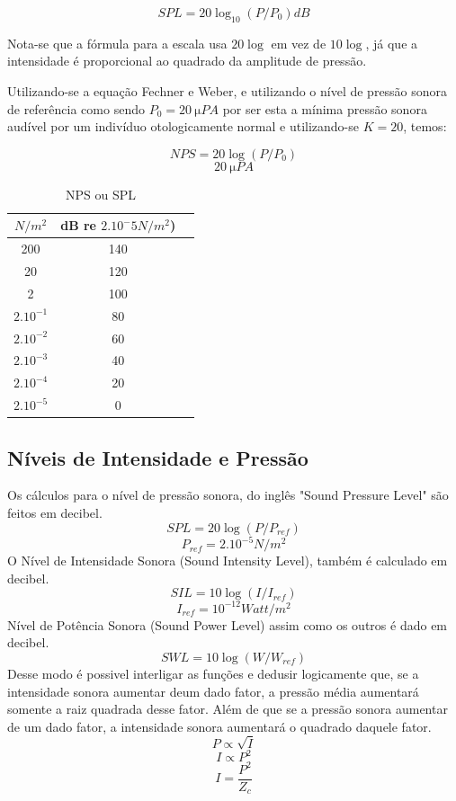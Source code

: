 \documentclass[
	article,			%
	11pt,				%
	oneside,			%
	a4paper,			%
	english,			%
	brazil,				%
	sumario=tradicional
	]{abntex2}
\begin{document}
$$SPL = 20 \log_{10}(P/P_0) dB$$

Nota-se que a fórmula para a escala usa $20 \log$ em vez de $10 \log$, já que a intensidade é proporcional ao quadrado da amplitude de pressão.

Utilizando-se a equação Fechner e Weber, e utilizando o nível de pressão sonora de referência como sendo $P_0 = \SI{20}{\micro}PA$ por ser esta a mínima pressão sonora audível por um indivíduo otologicamente normal e utilizando-se $K=20$, temos:

$$NPS = 20 \log (P/P_0)$$
$$\SI{20}{\micro}PA$$

\begin{table}[hb]
\centering
    \begin{tabular}{c c c}
$N/m^2$ & dB re $2 . 10^-5 N/m^2$)\\ 
\hline
200 & 140\\

20 & 120\\

2 & 100\\

$2 . 10^{-1}$ & 80\\

$2 . 10^{-2}$ & 60\\

$2 . 10^{-3}$ & 40\\

$2 . 10^{-4}$ & 20\\

$2 . 10^{-5}$ & 0\\

    \end{tabular}
    \caption{NPS ou SPL}
\end{table}

\subsection{Níveis de Intensidade e Pressão}
Os cálculos para o nível de pressão sonora, do inglês "Sound Pressure Level" são feitos em decibel.
$$SPL = 20 \log (P/P_{ref})$$
$$P_{ref} = 2.10^{-5} N/m^2$$
O Nível de Intensidade Sonora (Sound Intensity Level), também é calculado em decibel.
$$SIL = 10 \log (I/I_{ref})$$
$$I_{ref} = 10^{-12} Watt/m^2$$
Nível de Potência Sonora (Sound Power Level) assim como os outros é dado em decibel.
$$SWL = 10 \log (W/W_{ref})$$
Desse modo é possivel interligar as funções e dedusir logicamente que, se a intensidade sonora aumentar deum dado fator, a pressão média aumentará somente a raiz quadrada desse fator. Além de que se a pressão sonora aumentar de um dado fator, a intensidade sonora aumentará o quadrado daquele fator.
$$P \propto \sqrt{I}$$
$$I \propto P^2$$
$$I = \frac{P^2}{Z_c}$$
\end{document}
